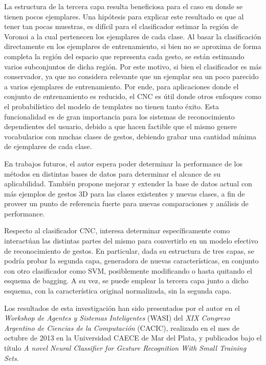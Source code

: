 La estructura de la tercera capa resulta beneficiosa para el caso en donde se tienen pocos ejemplares. Una hipótesis para explicar este resultado es que al tener tan pocas muestras, es difícil para el clasificador estimar la región de Voronoi a la cual pertenecen los ejemplares de cada clase. Al basar la clasificación directamente en los ejemplares de entrenamiento, si bien no se aproxima de forma completa la región del espacio que representa cada gesto, se están estimando varios subconjuntos de dicha región. Por este motivo, si bien el clasificador es más conservador, ya que no considera relevante que un ejemplar sea un poco parecido a varios ejemplares de entrenamiento. Por ende, para aplicaciones donde el conjunto de entrenamiento es reducido, el CNC es útil donde otros enfoques como el probabilístico del modelo de templates no tienen tanto éxito. Esta funcionalidad es de gran importancia para los sistemas de reconocimiento dependientes del usuario, debido a que hacen factible que el mismo genere vocabularios con muchas clases de gestos, debiendo grabar una cantidad mínima de ejemplares de cada clase.

En trabajos futuros, el autor espera poder determinar la performance de los métodos en distintas bases de datos para determinar el alcance de su aplicabilidad. También propone mejorar y extender la base de datos actual con más ejemplos de gestos 3D para las clases existentes y nuevas clases, a fin de proveer un punto de referencia fuerte para nuevas comparaciones y análisis de performance.
 

Respecto al clasificador CNC, interesa determinar específicamente como interactúan las distintas partes del mismo para convertirlo en un modelo efectivo de reconocimiento de gestos. En particular, dada su estructura de tres capas, se podría probar la segunda capa, generadora de nuevas características, en conjunto con otro clasificador como SVM, posiblemente modificando o hasta quitando el esquema de bagging. A su vez, se puede emplear la tercera capa junto a dicho esquema, con la característica original normalizada, sin la segunda capa.


Los resultados de esta investigación han sido presentados por el autor en el \textit{Workshop de Agentes y Sistemas Inteligentes} (WASI) del \textit{XIX Congreso Argentino de Ciencias de la Computación} (CACIC), realizado en el mes de octubre de 2013 en la Universidad CAECE de Mar del Plata, y publicados bajo el título \textit{A novel Neural Classifier for Gesture Recognition With Small Training Sets}\cite{quiroga2013}.
